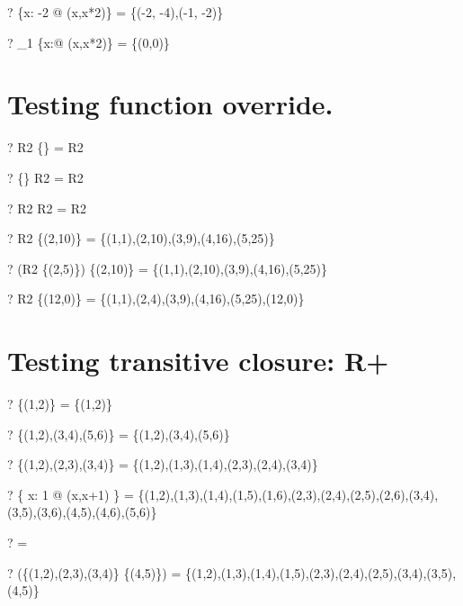 \documentclass{article}
\newcommand{\negate}{-}
\begin{document}
\begin{zed} \vdash? \nat \ndres \{x: \negate 2  @ (x,x*2)\} = \{(\negate 2, \negate 4),(\negate 1, \negate 2)\} \end{zed}
\begin{zed} \vdash? \nat_1 \ndres \{x:\nat @ (x,x*2)\} = \{(0,0)\} \end{zed}


\section{Testing function override.}
\begin{zed} \vdash? R2 \oplus \{\} = R2 \end{zed}
\begin{zed} \vdash? \{\} \oplus R2 = R2 \end{zed}
\begin{zed} \vdash? R2 \oplus R2   = R2 \end{zed}
\begin{zed} \vdash? R2 \oplus \{(2,10)\} = \{(1,1),(2,10),(3,9),(4,16),(5,25)\} \end{zed}
\begin{zed} \vdash? (R2 \cup \{(2,5)\}) \oplus \{(2,10)\} = \{(1,1),(2,10),(3,9),(4,16),(5,25)\} \end{zed}
\begin{zed} \vdash? R2 \oplus \{(12,0)\} = \{(1,1),(2,4),(3,9),(4,16),(5,25),(12,0)\} \end{zed}


\section{Testing transitive closure: R+}
\begin{zed} \vdash? \{(1,2)\} \plus = \{(1,2)\} \end{zed}
\begin{zed} \vdash? \{(1,2),(3,4),(5,6)\} \plus = \{(1,2),(3,4),(5,6)\} \end{zed}
\begin{zed} \vdash? \{(1,2),(2,3),(3,4)\} \plus = \{(1,2),(1,3),(1,4),(2,3),(2,4),(3,4)\} \end{zed}
\begin{zed} \vdash? \{ x: 1  @ (x,x+1) \} \plus = \{(1,2),(1,3),(1,4),(1,5),(1,6),(2,3),(2,4),(2,5),(2,6),(3,4),(3,5),(3,6),(4,5),(4,6),(5,6)\} \end{zed}
\begin{zed} \vdash? \emptyset \plus = \emptyset[\nat\cross\nat] \end{zed}
\begin{zed} \vdash? (\{(1,2),(2,3),(3,4)\} \cup \{(4,5)\}) \plus = \{(1,2),(1,3),(1,4),(1,5),(2,3),(2,4),(2,5),(3,4),(3,5),(4,5)\} \end{zed}
\end{document}
